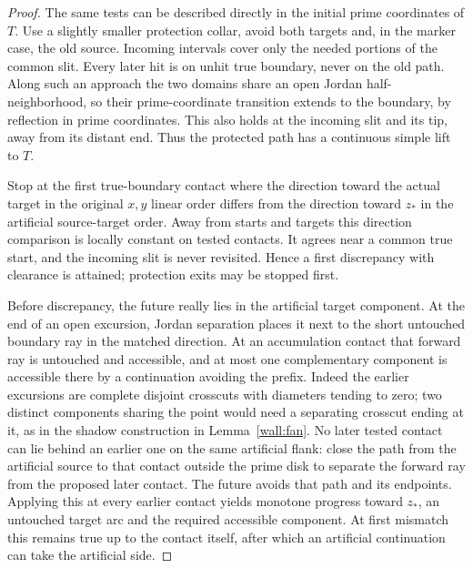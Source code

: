 \begin{proof}
The same tests can be described directly in the initial prime coordinates of $T$.  Use a slightly smaller protection collar, avoid both targets and, in the marker case, the old source.  Incoming intervals cover only the needed portions of the common slit.  Every later hit is on unhit true boundary, never on the old path.  Along such an approach the two domains share an open Jordan half-neighborhood, so their prime-coordinate transition extends to the boundary, by reflection in prime coordinates.  This also holds at the incoming slit and its tip, away from its distant end.  Thus the protected path has a continuous simple lift to $T$.

Stop at the first true-boundary contact where the direction toward the actual target in the original $x,y$ linear order differs from the direction toward $z_*$ in the artificial source-target order.  Away from starts and targets this direction comparison is locally constant on tested contacts.  It agrees near a common true start, and the incoming slit is never revisited.  Hence a first discrepancy with clearance is attained; protection exits may be stopped first.

Before discrepancy, the future really lies in the artificial target component.  At the end of an open excursion, Jordan separation places it next to the short untouched boundary ray in the matched direction.  At an accumulation contact that forward ray is untouched and accessible, and at most one complementary component is accessible there by a continuation avoiding the prefix.  Indeed the earlier excursions are complete disjoint crosscuts with diameters tending to zero; two distinct components sharing the point would need a separating crosscut ending at it, as in the shadow construction in Lemma~\ref{wall:fan}.  No later tested contact can lie behind an earlier one on the same artificial flank: close the path from the artificial source to that contact outside the prime disk to separate the forward ray from the proposed later contact.  The future avoids that path and its endpoints.  Applying this at every earlier contact yields monotone progress toward $z_*$, an untouched target arc and the required accessible component.  At first mismatch this remains true up to the contact itself, after which an artificial continuation can take the artificial side.


\end{proof}
